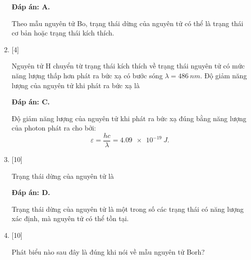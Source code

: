 \begin{enumerate}[label=\bfseries Câu \arabic*:]
		\loigiai
		{		\textbf{Đáp án: A.}

Theo mẫu nguyên tử Bo, trạng thái dừng của nguyên tử có thể là trạng thái cơ bản hoặc trạng thái kích thích. 
		}
		
		\item {} [4]
	
		\cauhoi
		{Nguyên tử H chuyển từ trạng thái kích thích về trạng thái nguyên tử có mức năng lượng thấp hơn phát ra bức xạ có bước sóng $ \lambda = \SI{486}{nm} $. Độ giảm năng lượng của nguyên tử khi phát ra bức xạ là
		}
	
		\loigiai
		{		\textbf{Đáp án: C.}
		
Độ giảm năng lượng của nguyên tử khi phát ra bức xạ đúng bằng năng lượng của photon phát ra cho bởi:
$$
	\varepsilon = \dfrac{hc}{\lambda} = \SI{4,09e-19}{J}.
$$
		}
		
		\item {}
	
		\cauhoi
		{Trạng thái dừng của nguyên tử là
		}
	
		\loigiai
		{		\textbf{Đáp án: D.}

Trạng thái dừng của nguyên tử là một trong số các trạng thái có năng lượng xác định, mà nguyên tử có thể tồn tại.		
		}
		
		\item {}
	
		\cauhoi
		{Phát biểu nào sau đây là đúng khi nói về mẫu nguyên tử Borh?
		}
	

\end{enumerate}
